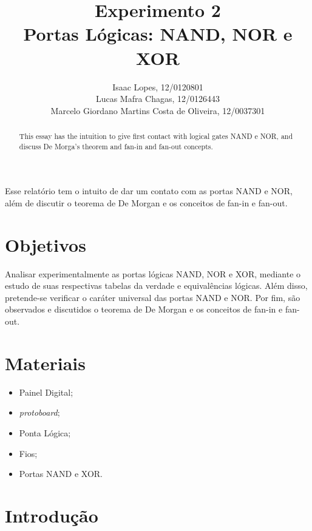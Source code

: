 \documentclass[12pt]{article}
\title{Experimento 2\\ 
	Portas Lógicas: NAND, NOR e XOR }
\author{Isaac Lopes, 12/0120801\\
	Lucas Mafra Chagas, 12/0126443 \\
	Marcelo Giordano Martins Costa de Oliveira,  12/0037301
}
\begin{document}
 

\maketitle

 \begin{abstract}
   This essay has the intuition to give first contact with logical gates NAND e NOR, and discuss De Morga's theorem and fan-in and fan-out concepts.
 \end{abstract}
     
 \begin{resumo} 
  Esse relatório tem o intuito de dar um contato com as portas NAND e NOR, além de discutir o teorema de De Morgan e os conceitos de fan-in e fan-out.
 \end{resumo}


\section{Objetivos}
\label{sec:Objetivos}

Analisar experimentalmente as portas lógicas NAND, NOR e XOR, mediante o estudo de suas respectivas tabelas da verdade e equivalências lógicas. Além disso, pretende-se verificar o caráter universal das portas NAND e NOR. Por fim, são observados e discutidos o teorema de De Morgan e os conceitos de fan-in e fan-out. 


\section{Materiais} 
\label{sec:Materiais}

\begin{itemize}
    \item Painel Digital;
    
    \item \textit{protoboard};
    
    \item Ponta Lógica;
    
    \item Fios;
    
    \item Portas NAND e XOR.
    
\end{itemize}


\section{Introdução}
\label{sec:Introducao}
\end{document}
